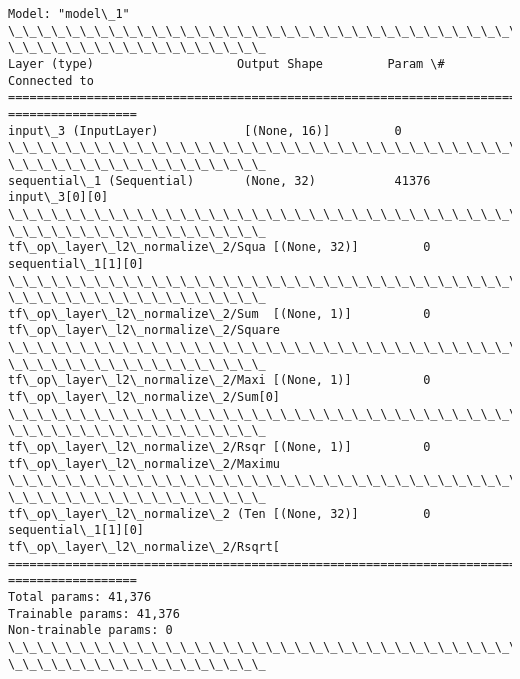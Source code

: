 \documentclass[11pt]{article}
\begin{document}
    \begin{Verbatim}[commandchars=\\\{\}]
Model: "model\_1"
\_\_\_\_\_\_\_\_\_\_\_\_\_\_\_\_\_\_\_\_\_\_\_\_\_\_\_\_\_\_\_\_\_\_\_\_\_\_\_\_\_\_\_\_\_\_\_\_\_\_\_\_\_\_\_\_\_\_\_\_\_\_\_\_\_\_\_\_\_\_\_\_\_\_\_\_\_\_\_\_
\_\_\_\_\_\_\_\_\_\_\_\_\_\_\_\_\_\_
Layer (type)                    Output Shape         Param \#     Connected to
================================================================================
==================
input\_3 (InputLayer)            [(None, 16)]         0
\_\_\_\_\_\_\_\_\_\_\_\_\_\_\_\_\_\_\_\_\_\_\_\_\_\_\_\_\_\_\_\_\_\_\_\_\_\_\_\_\_\_\_\_\_\_\_\_\_\_\_\_\_\_\_\_\_\_\_\_\_\_\_\_\_\_\_\_\_\_\_\_\_\_\_\_\_\_\_\_
\_\_\_\_\_\_\_\_\_\_\_\_\_\_\_\_\_\_
sequential\_1 (Sequential)       (None, 32)           41376       input\_3[0][0]
\_\_\_\_\_\_\_\_\_\_\_\_\_\_\_\_\_\_\_\_\_\_\_\_\_\_\_\_\_\_\_\_\_\_\_\_\_\_\_\_\_\_\_\_\_\_\_\_\_\_\_\_\_\_\_\_\_\_\_\_\_\_\_\_\_\_\_\_\_\_\_\_\_\_\_\_\_\_\_\_
\_\_\_\_\_\_\_\_\_\_\_\_\_\_\_\_\_\_
tf\_op\_layer\_l2\_normalize\_2/Squa [(None, 32)]         0
sequential\_1[1][0]
\_\_\_\_\_\_\_\_\_\_\_\_\_\_\_\_\_\_\_\_\_\_\_\_\_\_\_\_\_\_\_\_\_\_\_\_\_\_\_\_\_\_\_\_\_\_\_\_\_\_\_\_\_\_\_\_\_\_\_\_\_\_\_\_\_\_\_\_\_\_\_\_\_\_\_\_\_\_\_\_
\_\_\_\_\_\_\_\_\_\_\_\_\_\_\_\_\_\_
tf\_op\_layer\_l2\_normalize\_2/Sum  [(None, 1)]          0
tf\_op\_layer\_l2\_normalize\_2/Square
\_\_\_\_\_\_\_\_\_\_\_\_\_\_\_\_\_\_\_\_\_\_\_\_\_\_\_\_\_\_\_\_\_\_\_\_\_\_\_\_\_\_\_\_\_\_\_\_\_\_\_\_\_\_\_\_\_\_\_\_\_\_\_\_\_\_\_\_\_\_\_\_\_\_\_\_\_\_\_\_
\_\_\_\_\_\_\_\_\_\_\_\_\_\_\_\_\_\_
tf\_op\_layer\_l2\_normalize\_2/Maxi [(None, 1)]          0
tf\_op\_layer\_l2\_normalize\_2/Sum[0]
\_\_\_\_\_\_\_\_\_\_\_\_\_\_\_\_\_\_\_\_\_\_\_\_\_\_\_\_\_\_\_\_\_\_\_\_\_\_\_\_\_\_\_\_\_\_\_\_\_\_\_\_\_\_\_\_\_\_\_\_\_\_\_\_\_\_\_\_\_\_\_\_\_\_\_\_\_\_\_\_
\_\_\_\_\_\_\_\_\_\_\_\_\_\_\_\_\_\_
tf\_op\_layer\_l2\_normalize\_2/Rsqr [(None, 1)]          0
tf\_op\_layer\_l2\_normalize\_2/Maximu
\_\_\_\_\_\_\_\_\_\_\_\_\_\_\_\_\_\_\_\_\_\_\_\_\_\_\_\_\_\_\_\_\_\_\_\_\_\_\_\_\_\_\_\_\_\_\_\_\_\_\_\_\_\_\_\_\_\_\_\_\_\_\_\_\_\_\_\_\_\_\_\_\_\_\_\_\_\_\_\_
\_\_\_\_\_\_\_\_\_\_\_\_\_\_\_\_\_\_
tf\_op\_layer\_l2\_normalize\_2 (Ten [(None, 32)]         0
sequential\_1[1][0]
tf\_op\_layer\_l2\_normalize\_2/Rsqrt[
================================================================================
==================
Total params: 41,376
Trainable params: 41,376
Non-trainable params: 0
\_\_\_\_\_\_\_\_\_\_\_\_\_\_\_\_\_\_\_\_\_\_\_\_\_\_\_\_\_\_\_\_\_\_\_\_\_\_\_\_\_\_\_\_\_\_\_\_\_\_\_\_\_\_\_\_\_\_\_\_\_\_\_\_\_\_\_\_\_\_\_\_\_\_\_\_\_\_\_\_
\_\_\_\_\_\_\_\_\_\_\_\_\_\_\_\_\_\_
    \end{Verbatim}
\end{document}
